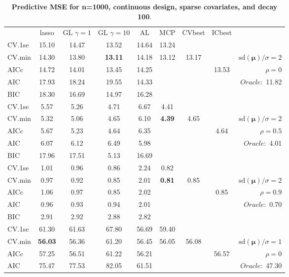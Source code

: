 \clearpage
\begin{table}\vspace{-.5cm}
\caption[l]{ { \bf Predictive MSE for n=1000, continuous design, 
sparse covariates, and  decay  100}.}
\vspace{-.5cm}
\footnotesize{}
\begin{center}
\begin{tabular}{l*{7}{c}|r}
 & lasso & GL $\gamma=1$ & GL $\gamma=10$ & AL & MCP  & CVbest & ICbest  \\
\cline{1-9}
CV.1se & 15.10 & 14.47 & 13.52 & 14.64 & 13.24 & & & \\
CV.min & 14.30 & 13.80 & {\bf 13.11} & 14.18 & 13.12 & 13.17 & & $\mathrm{sd}(\mathbf{\mu})/\sigma=2$ \\
AICc & 14.72 & 14.01 & 13.45 & 14.25 & & & 13.53 &  $\rho=0$ \\
AIC & 17.93 & 18.24 & 19.55 & 14.33 & & & &  \multirow{2}{*}{$Oracle: $ 11.82} \\
BIC & 18.30 & 16.69 & 14.97 & 16.28 & & & &  \\
 \hline 
CV.1se & 5.57 & 5.26 & 4.71 & 6.67 & 4.41 & & & \\
CV.min & 5.32 & 5.06 & 4.65 & 6.10 & {\bf 4.39} & 4.65 & & $\mathrm{sd}(\mathbf{\mu})/\sigma=2$ \\
AICc & 5.67 & 5.23 & 4.64 & 6.35 & & & 4.64 &  $\rho=0.5$ \\
AIC & 6.07 & 6.12 & 6.49 & 5.98 & & & &  \multirow{2}{*}{$Oracle: $ 4.01} \\
BIC & 17.96 & 17.51 & 5.13 & 16.69 & & & &  \\
 \hline 
CV.1se & 1.01 & 0.96 & 0.86 & 2.24 & 0.82 & & & \\
CV.min & 0.97 & 0.92 & 0.85 & 2.01 & {\bf 0.81} & 0.85 & & $\mathrm{sd}(\mathbf{\mu})/\sigma=2$ \\
AICc & 1.06 & 0.97 & 0.85 & 2.02 & & & 0.85 &  $\rho=0.9$ \\
AIC & 0.96 & 0.93 & 0.94 & 2.01 & & & &  \multirow{2}{*}{$Oracle: $ 0.70} \\
BIC & 2.91 & 2.92 & 2.88 & 2.82 & & & &  \\
 \hline 
CV.1se & 61.30 & 61.63 & 67.80 & 56.69 & 59.40 & & & \\
CV.min & {\bf 56.03} & 56.36 & 61.20 & 56.45 & 56.05 & 56.08 & & $\mathrm{sd}(\mathbf{\mu})/\sigma=1$ \\
AICc & 57.25 & 56.51 & 61.22 & 56.21 & & & 56.57 &  $\rho=0$ \\
AIC & 75.47 & 77.53 & 82.05 & 61.51 & & & &  \multirow{2}{*}{$Oracle: $ 47.30} \\

\end{tabular}
\end{center}
\end{table}
